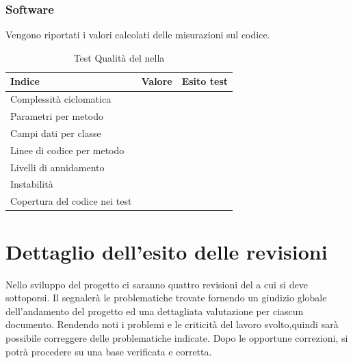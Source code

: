 \documentclass[12pt,a4paper]{article}
\begin{document}
	\subsubsection{Software}
	Vengono riportati i valori calcolati delle misurazioni sul codice. 
		\TODO{}
		\begin{table}[H]
			\begin{center}
				\begin{tabular}{p{} p{} p{}}
					\toprule
					\textbf{Indice}   & \textbf{Valore}	& \textbf{Esito test} \\ \midrule
					\midrule
					Complessità ciclomatica &  & \\ \midrule
					Parametri per metodo &  & \\ \midrule
					Campi dati per classe  &  &  \\ \midrule
					Linee di codice per metodo &  &  \\ \midrule
					Livelli di annidamento &  &  \\ \midrule
					Instabilità &  &  \\ \midrule
					Copertura del codice nei test &  & \\ \bottomrule
				\end{tabular}	
			\end{center}
			\caption{Test Qualità del  nella \FC}
		\end{table}
	
	
	\newpage
	\section{Dettaglio dell'esito delle revisioni}
	Nello sviluppo del progetto ci saranno quattro revisioni del  a cui si deve sottoporsi. Il  segnalerà le problematiche trovate fornendo un giudizio globale dell'andamento del progetto ed una dettagliata valutazione per ciascun documento. Rendendo noti i problemi e le criticità del lavoro svolto,quindi sarà possibile correggere delle problematiche indicate. Dopo le opportune correzioni, si potrà procedere su una base verificata e corretta.
	
\end{document}
